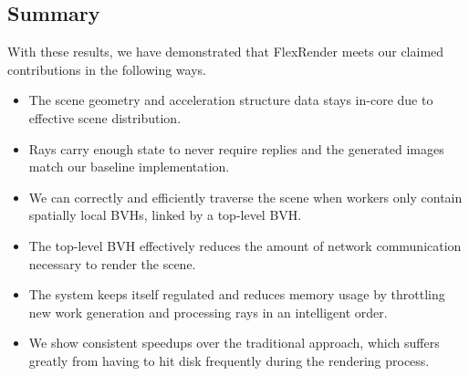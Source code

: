 \documentclass[a4paper,twoside]{article}
\begin{document}


\subsection{Summary}
\label{resultssummary}

With these results, we have demonstrated that FlexRender meets our claimed
contributions in the following ways. 

\begin{itemize}
    \item The scene geometry and acceleration structure data stays in-core due
        to effective scene distribution.
    \item Rays carry enough state to never require replies and the generated
        images match our baseline implementation.
    \item We can correctly and efficiently traverse the scene when workers
        only contain spatially local BVHs, linked by a top-level BVH.
    \item The top-level BVH effectively reduces the amount of network
        communication necessary to render the scene.
    \item The system keeps itself regulated and reduces memory usage by
        throttling new work generation and processing rays in an intelligent
        order.
    \item We show consistent speedups over the traditional approach, which
        suffers greatly from having to hit disk frequently during the
        rendering process.
\end{itemize}
\end{document}
